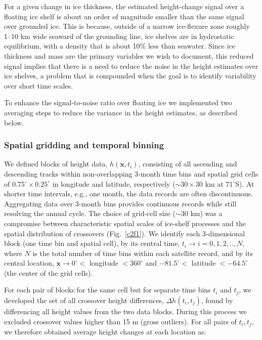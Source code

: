 \noindent
For a given change in ice thickness, the estimated height-change signal over a floating ice shelf is about an order of magnitude smaller than the same signal over grounded ice. This is because, outside of a narrow ice-flexure zone roughly 1--10 km wide seaward of the grounding line, ice shelves are in hydrostatic equilibrium, with a density that is about 10\% less than seawater. Since ice thickness and mass are the primary variables we wish to document, this reduced signal implies that there is a need to reduce the noise in the height estimates over ice shelves, a problem that is compounded when the goal is to identify variability over short time scales.

To enhance the signal-to-noise ratio over floating ice we implemented two averaging steps to reduce the variance in the height estimates, as described below.

\subsubsection{Spatial gridding and temporal binning}

\noindent
We defined blocks of height data, $h(\mathbf{x},t_i)$, consisting of all ascending and descending tracks within non-overlapping 3-month time bins and spatial grid cells of 0.75$^\circ \times 0.25^\circ$ in longitude and latitude, respectively ($\sim30 \times 30$ km at 71$^\circ$S). At shorter time intervals, e.g., one month, the data records are often discontinuous. Aggregating data over 3-month bins provides continuous records while still resolving the annual cycle. The choice of grid-cell size ($\sim$30 km) was a compromise between characteristic spatial scales of ice-shelf processes and the spatial distribution of crossovers (Fig.~\ref{c2f1}). We identify each 3-dimensional block (one time bin and spatial cell), by its central time, $t_i \rightarrow i=0,1,2,..,N$, where $N$ is the total number of time bins within each satellite record, and by its central location, $\mathbf x \rightarrow 0^\circ <$ longitude $< 360^\circ$ and $-81.5^\circ <$ latitude $< -64.5^\circ$ (the center of the grid cells).

For each pair of blocks for the same cell but for separate time bins $t_i$ and $t_j$, we developed the set of all crossover height differences, ${\Delta h(t_i,t_j)}$, found by differencing all height values from the two data blocks. During this process we excluded crossover values higher than 15 m (gross outliers). For all pairs of ${t_i,t_j}$, we therefore obtained average height changes at each location as:

